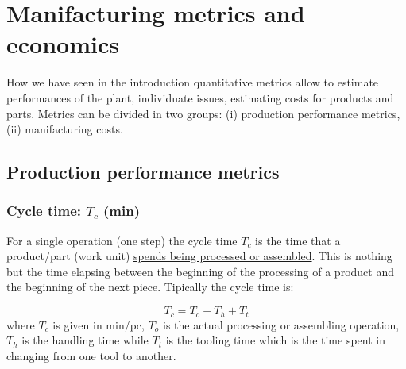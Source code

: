 \section{Manifacturing metrics and economics}
How we have seen in the introduction quantitative metrics allow to estimate performances of the plant, individuate issues, estimating costs for products and parts. Metrics can be divided in two groups: (i) production performance metrics, (ii) manifacturing costs.
\subsection{\color{red} Production performance metrics}
\subsubsection{Cycle time: $T_c$ (min)}
For a single operation (one step) the cycle time $T_c$ is the time that a product/part (work unit) \underline{spends being processed or assembled}. This is nothing but the time elapsing between the beginning of the processing of a product and the beginning of the next piece. Tipically the cycle time is: 

\begin{equation}
    T_c=T_o+T_h+T_t
\end{equation}
where $T_c$ is given in min/pc, $T_o$ is the actual processing or assembling operation, $T_h$ is the handling time while $T_t$ is the tooling time which is the time spent in changing from one tool to another.


